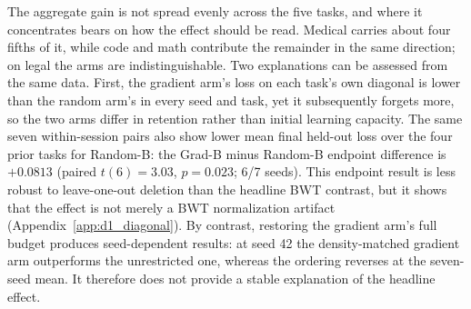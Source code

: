 The aggregate gain is not spread evenly across the five tasks, and where it concentrates bears on how the effect should be read. Medical carries about four fifths of it, while code and math contribute the remainder in the same direction; on legal the arms are indistinguishable. 
Two explanations can be assessed from the same data. First, the gradient arm's loss on each task's own diagonal is lower than the random arm's in every seed and task, yet it subsequently forgets more, so the two arms differ in retention rather than initial learning capacity. The same seven within-session pairs also show lower mean final held-out loss over the four prior tasks for Random-B: the Grad-B minus Random-B endpoint difference is $+0.0813$ (paired $t(6)=3.03$, $p=0.023$; 6/7 seeds). This endpoint result is less robust to leave-one-out deletion than the headline BWT contrast, but it shows that the effect is not merely a BWT normalization artifact (Appendix~\ref{app:d1_diagonal}). By contrast, restoring the gradient arm's full budget produces seed-dependent results: at seed 42 the density-matched gradient arm outperforms the unrestricted one, whereas the ordering reverses at the seven-seed mean. It therefore does not provide a stable explanation of the headline effect.



